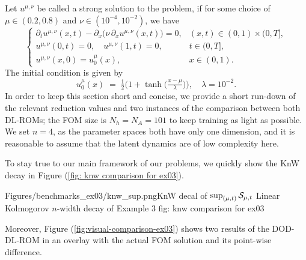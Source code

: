 Let $u^{\mu, \nu}$ be called a strong solution to the
problem, if for some choice of $\mu  \in (0.2,0.8)$ and $\nu \in  (10^{-4},10^{-2})$, we have 
\begin{equation*}
    \begin{cases}
    \displaystyle
    \partial_t u^{\mu,\nu}(x,t)
    - \partial_x\big(\nu\,\partial_x u^{\mu,\nu}(x,t)\big)
    = 0,
    & (x,t)\in (0,1)\times(0,T], \\[0.8em]
    \displaystyle
    u^{\mu,\nu}(0,t) = 0,\quad u^{\mu,\nu}(1,t)=0,
    & t\in (0,T], \\[0.8em]
    \displaystyle
    u^{\mu,\nu}(x,0) = u_0^{\mu}(x),
    & x\in (0,1).
    \end{cases}
\end{equation*}
The initial condition is given by
\begin{equation*}
    u_0^{\mu}(x) \;=\; \tfrac{1}{2}\Big(1 + \tanh\!\big(\tfrac{x-\mu}{\lambda}\big)\Big),
    \quad \lambda = 10^{-2}.
\end{equation*}
In order to keep this section short and concise, we provide a short run-down of the relevant reduction
values and two instances of the comparison between both DL-ROMs;
the FOM size is $N_h = N_A = 101$ to keep training as light as possible. We set $n = 4$,
as the parameter spaces both have only one dimension, and it is reasonable to assume that the latent
dynamics are of low complexity here.  

To stay true to our main framework of our problems, 
we quickly show the KnW decay in Figure (\ref{fig: knw comparison for ex03}).

%
    {Figures/benchmarks_ex03/knw_sup.png}{KnW decal of $\sup_{(\mu, t)} \mathcal{S}_{\mu, t}$}%
    {Linear Kolmogorov $n$-width decay of Example 3}
    {fig: knw comparison for ex03}

Moreover,
Figure (\ref{fig:visual-comparison-ex03}) 
shows two results of the DOD-DL-ROM in an overlay with the actual FOM solution and its point-wise difference.
    
